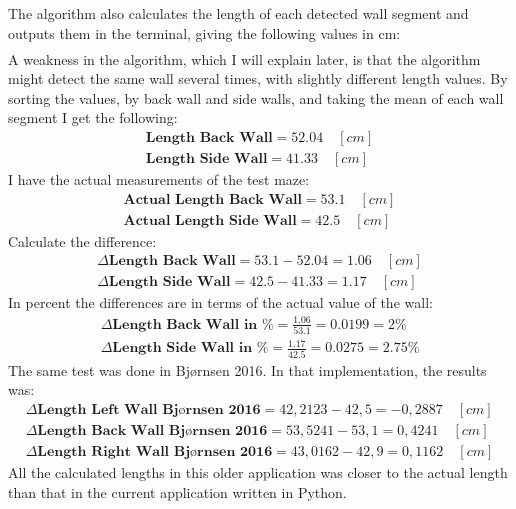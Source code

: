The algorithm also calculates the length of each detected wall segment and outputs them in the terminal, giving the following values in cm: 
\begin{align*}
[52.13614559709601, 
51.84253572745204, 
41.58182396984803,\\
41.454211626629274, 
40.893884097286644, 
52.13614559709601,\\
41.18835500372284, 
51.989768062876635,
52.08792302779498,\\
41.482826496385684,
41.40344063095725]
\end{align*}
A weakness in the algorithm, which I will explain later, is that the algorithm might detect the same wall several times, with slightly different length values. By sorting the values, by back wall and side walls, and taking the mean of each wall segment I get the following:
\begin{align*}
\textbf{Length Back Wall} = 52.04 \quad [cm]\\
\textbf{Length Side Wall} = 41.33 \quad [cm]
\end{align*}
I have the actual measurements of the test maze:
\begin{align*}
\textbf{Actual Length Back Wall} = 53.1 \quad [cm]\\
\textbf{Actual Length Side Wall} = 42.5 \quad [cm]
\end{align*}
Calculate the difference:
\begin{align*}
\Delta\textbf{Length Back Wall} = 53.1 - 52.04 = 1.06 \quad [cm]\\
\Delta\textbf{Length Side Wall} = 42.5 - 41.33 = 1.17 \quad [cm]
\end{align*}
In percent the differences are in terms of the actual value of the wall:
\begin{align*}
\Delta\textbf{Length Back Wall in \%} = \frac{1.06}{53.1} = 0.0199 = 2\% \\
\Delta\textbf{Length Side Wall in \%} = \frac{1.17}{42.5} = 0.0275 = 2.75\%
\end{align*}
The same test was done in Bjørnsen 2016\cite{kris}. In that implementation, the results was:
\begin{align*}
\Delta\textbf{Length Left Wall Bjørnsen 2016} = 42,2123-42,5 = -0,2887\quad [cm]\\
\Delta\textbf{Length Back Wall Bjørnsen 2016} = 53,5241-53,1 = 0,4241\quad [cm]\\
\Delta\textbf{Length Right Wall Bjørnsen 2016} = 43,0162-42,9 = 0,1162\quad [cm]
\end{align*}
All the calculated lengths in this older application was closer to the actual length than that in the current application written in Python. 





















